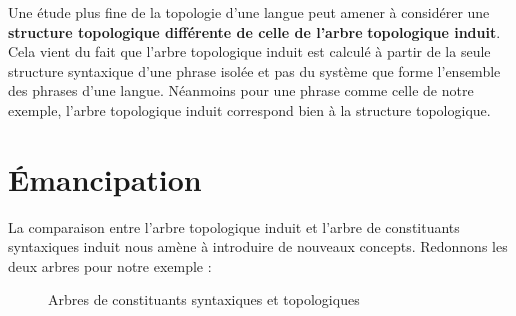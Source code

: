 Une étude plus fine de la topologie d’une langue peut amener à considérer une \textbf{structure topologique différente de celle de l’arbre} \textbf{topologique induit}. Cela vient du fait que l’arbre topologique induit est calculé à partir de la seule structure syntaxique d’une phrase isolée et pas du système que forme l’ensemble des phrases d’une langue. Néanmoins pour une phrase comme celle de notre exemple, l’arbre topologique induit correspond bien à la structure topologique.

\section{Émancipation}\label{sec:3.5.31}

La comparaison entre l’arbre topologique induit et l’arbre de constituants syntaxiques induit nous amène à introduire de nouveaux concepts. Redonnons les deux arbres pour notre exemple :

\begin{figure}
\begin{minipage}[c]{.5\linewidth}\centering
{}
\end{minipage}\begin{minipage}[c]{.5\linewidth}\centering
{}
\end{minipage}
\caption{\label{fig:}Arbres de constituants syntaxiques et topologiques}
\end{figure}

